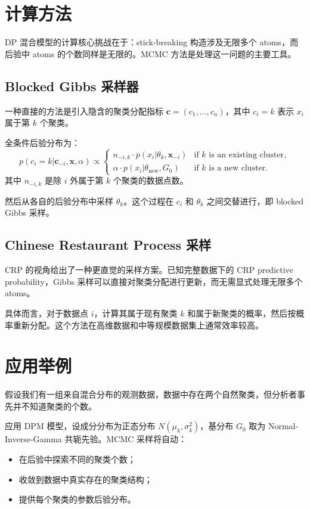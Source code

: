 \section{计算方法}

DP 混合模型的计算核心挑战在于：stick-breaking 构造涉及无限多个 atoms，而后验中 atoms 的个数同样是无限的。MCMC 方法是处理这一问题的主要工具。

\subsection{Blocked Gibbs 采样器}

一种直接的方法是引入隐含的聚类分配指标 $\mathbf{c} = (c_1, \ldots, c_n)$，其中 $c_i = k$ 表示 $x_i$ 属于第 $k$ 个聚类。

全条件后验分布为：
\[
p(c_i = k | \mathbf{c}_{-i}, \mathbf{x}, \alpha) \propto
\begin{cases}
n_{-i,k} \cdot p(x_i | \theta_k, \mathbf{x}_{-i}) & \text{if } k \text{ is an existing cluster}, \\
\alpha \cdot p(x_i | \theta_{\mathrm{new}}, G_0) & \text{if } k \text{ is a new cluster}.
\end{cases}
\]
其中 $n_{-i,k}$ 是除 $i$ 外属于第 $k$ 个聚类的数据点数。

然后从各自的后验分布中采样 $\theta_k$。这个过程在 $c_i$ 和 $\theta_k$ 之间交替进行，即 blocked Gibbs 采样。

\subsection{Chinese Restaurant Process 采样}

CRP 的视角给出了一种更直觉的采样方案。已知完整数据下的 CRP predictive probability，Gibbs 采样可以直接对聚类分配进行更新，而无需显式处理无限多个 atoms。

具体而言，对于数据点 $i$，计算其属于现有聚类 $k$ 和属于新聚类的概率，然后按概率重新分配。这个方法在高维数据和中等规模数据集上通常效率较高。

\section{应用举例}

\begin{Example}[基于 DP 聚类的密度估计]
假设我们有一组来自混合分布的观测数据，数据中存在两个自然聚类，但分析者事先并不知道聚类的个数。

应用 DPM 模型，设成分分布为正态分布 $N(\mu_k, \sigma^2_k)$，基分布 $G_0$ 取为 Normal-Inverse-Gamma 共轭先验。MCMC 采样将自动：
\begin{itemize}
  \item 在后验中探索不同的聚类个数；
  \item 收敛到数据中真实存在的聚类结构；
  \item 提供每个聚类的参数后验分布。
\end{itemize}
\end{Example}


